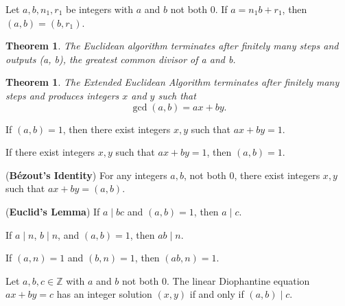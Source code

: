 \documentclass{article}
\newtheorem{theorem}{Theorem}
\newtheorem*{theorem*}{Theorem}
\theoremstyle{definition}
\newenvironment{manualtheorem}[1]{%
  \renewcommand{\thetheorem}{#1}%
  \theorem%
}{%
  \endtheorem%
}
\begin{document}
\begin{manualtheorem}{1.33}
	Let $a, b, n_{1}, r_{1}$ be integers with $a$ and $b$ not both $0$.  
If $a = n_{1}b + r_{1}$, then $(a, b) = (b, r_{1})$.
\end{manualtheorem}

\begin{theorem*}
	The Euclidean algorithm terminates after finitely many steps and outputs
(a, b), the greatest common divisor of a and b.
\end{theorem*}

\begin{theorem}
The Extended Euclidean Algorithm terminates after finitely many steps and 
produces integers $x$ and $y$ such that
\[
\gcd(a,b) = ax + by.
\]
\end{theorem}


\begin{manualtheorem}{1.38}
	If $(a,b)=1$, then there exist integers $x,y$ such that $ax+by=1$.
\end{manualtheorem}

\begin{manualtheorem}{1.39}
	If there exist integers $x,y$ such that $ax+by=1$, then $(a,b)=1$.
\end{manualtheorem}

\begin{manualtheorem}{1.40}
	(\textbf{B\'ezout's Identity}) For any integers $a,b$, not both $0$, there exist integers $x,y$ such that $ax+by=(a,b)$.
\end{manualtheorem}

\begin{manualtheorem}{1.41}
	(\textbf{Euclid's Lemma}) If $a \mid bc$ and $(a,b)=1$, then $a \mid c$.
\end{manualtheorem}

\begin{manualtheorem}{1.42}
	If $a \mid n$, $b \mid n$, and $(a,b)=1$, then $ab \mid n$.
\end{manualtheorem}

\begin{manualtheorem}{1.43}
	If $(a,n)=1$ and $(b,n)=1$, then $(ab,n)=1$.
\end{manualtheorem}

\begin{manualtheorem}{1.48}
	Let $a,b,c \in \mathbb{Z}$ with $a$ and $b$ not both $0$. The linear Diophantine equation $ax+by=c$ has an integer solution $(x,y)$ if and only if $(a,b)\mid c$.
\end{manualtheorem}
\end{document}
